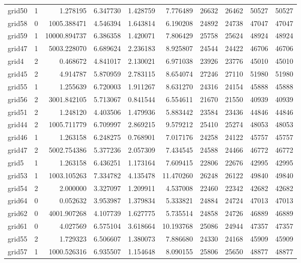 \begin{longtable}{|l|r|r|r|r|r|r|r|r|r|}
grid50 & 1 & 1.278195 & 6.347730 & 1.428759 & 7.776489 & 26632 & 26462 & 50527 & 50527 \\
grid58 & 0 & 1005.388471 & 4.546394 & 1.643814 & 6.190208 & 24892 & 24738 & 47047 & 47047 \\
grid59 & 1 & 10000.894737 & 6.386358 & 1.420071 & 7.806429 & 25758 & 25624 & 48924 & 48924 \\
grid47 & 1 & 5003.228070 & 6.689624 & 2.236183 & 8.925807 & 24544 & 24422 & 46706 & 46706 \\
grid4 & 2 & 0.468672 & 4.841017 & 2.130021 & 6.971038 & 23926 & 23776 & 45010 & 45010 \\
grid45 & 2 & 4.914787 & 5.870959 & 2.783115 & 8.654074 & 27246 & 27110 & 51980 & 51980 \\
grid55 & 1 & 1.255639 & 6.720003 & 1.911267 & 8.631270 & 24316 & 24154 & 45888 & 45888 \\
grid56 & 2 & 3001.842105 & 5.713067 & 0.841544 & 6.554611 & 21670 & 21550 & 40939 & 40939 \\
grid51 & 2 & 1.248120 & 4.403506 & 1.479936 & 5.883442 & 23584 & 23436 & 44846 & 44846 \\
grid44 & 2 & 1005.711779 & 6.709997 & 2.869215 & 9.579212 & 25410 & 25274 & 48053 & 48053 \\
grid46 & 1 & 1.263158 & 6.248275 & 0.768901 & 7.017176 & 24258 & 24122 & 45757 & 45757 \\
grid47 & 2 & 5002.754386 & 5.377236 & 2.057309 & 7.434545 & 24588 & 24466 & 46772 & 46772 \\
grid5 & 1 & 1.263158 & 6.436251 & 1.173164 & 7.609415 & 22806 & 22676 & 42995 & 42995 \\
grid53 & 1 & 1003.105263 & 7.334782 & 4.135478 & 11.470260 & 26248 & 26122 & 49840 & 49840 \\
grid54 & 2 & 2.000000 & 3.327097 & 1.209911 & 4.537008 & 22460 & 22342 & 42682 & 42682 \\
grid64 & 0 & 0.052632 & 3.953987 & 1.379834 & 5.333821 & 24884 & 24724 & 47013 & 47013 \\
grid62 & 0 & 4001.907268 & 4.107739 & 1.627775 & 5.735514 & 24858 & 24726 & 46889 & 46889 \\
grid61 & 0 & 4.027569 & 6.575104 & 3.618664 & 10.193768 & 25086 & 24944 & 47357 & 47357 \\
grid55 & 2 & 1.729323 & 6.506607 & 1.380073 & 7.886680 & 24330 & 24168 & 45909 & 45909 \\
grid57 & 1 & 1000.526316 & 6.935507 & 1.154648 & 8.090155 & 25806 & 25650 & 48877 & 48877 \\

\end{longtable}
